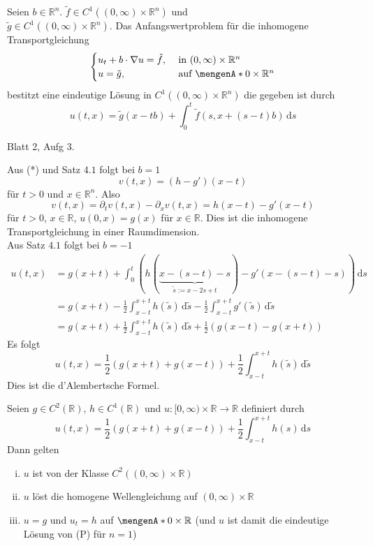 \begin{satz}[Transportgleichung]
	Seien $b \in \mathbb{R}^n$. $ \tilde f \in C^1( (0, \infty) \times \mathbb{R}^n)$ und \\ $ \tilde g \in C^1((0,\infty) \times \mathbb{R}^n)$. Das Anfangswertproblem für die inhomogene Transportgleichung
	\[
		\begin{cases}
			u_t + b \cdot  \nabla u = \tilde f, &\text{ in }(0,\infty) \times \mathbb{R}^n\\
			u = \tilde g, &\text{ auf } \set{0} \times \mathbb{R}^n
			
		\end{cases}
	\]
	bestitzt eine eindeutige Lösung in $C^1((0,\infty) \times \mathbb{R}^n)$ die gegeben ist durch
	\[
		u(t,x) = \tilde g(x-tb) + \int_{0}^{t} \tilde f(s,x+(s-t)b) \,\mathrm{d}s
	\]
\end{satz}
\begin{beweis}
	Blatt 2, Aufg 3.
\end{beweis}
Aus (*) und Satz $4.1$ folgt bei $b = 1$
\[
	v(t,x) = (h-g')(x-t) 
\]
für $t>0$ und $x \in \mathbb{R}^n$. Also
\[
	v(t,x) = \partial_t v(t,x) - \partial_x v(t,x) = h(x-t) - g'(x-t)
\]
für $t>0$, $x \in \mathbb{R}$, $u(0,x) = g(x)$ für $x \in \mathbb{R}$.
Dies ist die inhomogene Transportgleichung in einer Raumdimension. \\
Aus Satz $4.1$ folgt bei $b = -1$
\begin{align*}
	u(t,x) &= g(x+t) + \int_{0}^{t}(h(\underset{\tilde s := x -2s + t}{\underbrace{x-(s-t)-s}}) - g'(x-(s-t)-s)) \,\mathrm{d}s \\
	&= g(x+t) - \frac{1}{2} \int_{x-t}^{x+t} h(\tilde s) \,\mathrm{d}\tilde s - \frac{1}{2} \int_{x-t}^{x+t} g'(\tilde s) \,\mathrm{d} \tilde s \\
	&= g(x+t) + \frac{1}{2} \int_{x-t}^{x+t} h(\tilde s) \,\mathrm{d}\tilde s + \frac{1}{2} (g(x-t)-g(x+t))
\end{align*}
Es folgt
\[
	u(t,x) = \frac{1}{2} (g(x+t)+ g(x-t)) + \frac{1}{2} \int_{x-t}^{x+t}h(\tilde s) \,\mathrm{d}\tilde s
\]
Dies ist die d'Alembertsche Formel.
\begin{satz}
	Seien $g \in C^2(\mathbb{R})$, $h \in C^1(\mathbb{R})$ und $u: [0, \infty) \times \mathbb{R} \to  \mathbb{R}$ definiert durch
	\[
		u(t,x)= \frac{1}{2} (g(x+t)+ g(x-t))+ \frac{1}{2} \int_{x-t}^{x+t} h(s) \,\mathrm{d}s
	\]
	Dann gelten
	\begin{enumerate}[(i)]
		\item $u$ ist von der Klasse $C^2((0,\infty) \times \mathbb{R})$ 
		\item $u$ löst die homogene Wellengleichung auf $(0,\infty) \times \mathbb{R}$
		\item $u=g$ und $u_t = h$ auf $\set{0} \times \mathbb{R}$ (und $u$ ist damit die eindeutige Lösung von (P) für $n=1$)
	\end{enumerate}
\end{satz}
